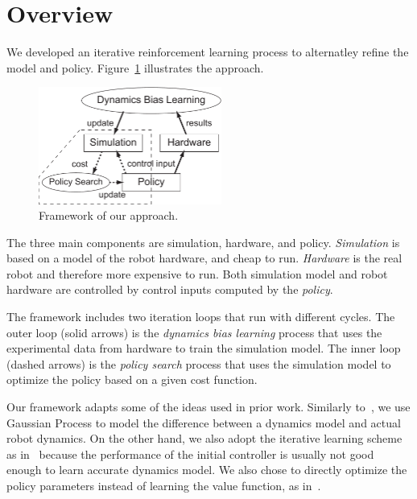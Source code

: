 \documentclass[letterpaper, 10 pt, conference]{ieeeconf}
\begin{document}
\section{Overview} \label{sec:learning_overview}

We developed an iterative reinforcement learning process to alternatley
refine the model and policy.
Figure~\ref{fig:learning_framework} illustrates the approach.

\begin{figure}[tb]
\begin{center}
\includegraphics[width=60mm]{eps/framework.pdf}
\caption{Framework of our approach.}
\label{fig:learning_framework}
\end{center}
\end{figure}

The three main components are simulation, hardware, and policy.
{\em Simulation} is based on a model of the robot hardware, and cheap to run.
{\em Hardware} is the real robot and therefore more expensive to run.
Both simulation model and robot hardware are controlled by control
inputs computed by the {\em policy}.

The framework includes two iteration loops that run with different
cycles. 
The outer loop (solid arrows) is the {\em dynamics bias learning}
process that uses the experimental data from hardware to train the
simulation model. 
The inner loop (dashed arrows) is the {\em policy search} process that
uses the simulation model to optimize the policy based on a given cost
function.

Our framework adapts some of the ideas used in prior work.
Similarly to~\cite{bib-ko-blimp}, we use Gaussian Process to model the
difference between a dynamics model and actual robot dynamics.
On the other hand, we also adopt the iterative learning scheme as
in~\cite{bib-abbeel-inaccurate} because the performance of the initial
controller is usually not good enough to learn accurate dynamics model.
We also chose to directly optimize the policy parameters instead of
learning the value function, as in~\cite{bib-deisenroth-data-efficient}.
\end{document}
